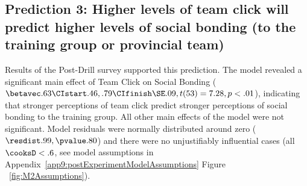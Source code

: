 \begin{CJK}{UTF8}{gbsn}


\subsection{Prediction 3: Higher levels of team click will predict higher levels of social bonding (to the training group or provincial team)}


Results of the Post-Drill survey supported this prediction. The model revealed a significant main effect of Team Click on Social Bonding ($\betavec .63 \CIstart .46, .79 \CIfinish \SE .09, t(53) = 7.28, p < .01$), indicating that stronger perceptions of team click predict stronger perceptions of social bonding to the training group.  All other main effects of the model were not significant.  Model residuals were normally distributed around zero ($\resdist .99, \pvalue .80$) and there were no unjustifiably influential cases (all $\cooksD < .6$, see model assumptions in Appendix~\ref{app9:postExperimentModelAssumptions} Figure ~\ref{fig:M2Assumptions}).








\end{CJK}
